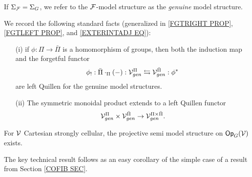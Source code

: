 \documentclass[a4paper,10pt]{article}%
\begin{document}
\begin{notation} 
  If $\Sigma_{\mathcal F} = \Sigma_G$, we refer to the $\mathcal F$-model structure as the \textit{genuine} model structure. 
\end{notation} 

\begin{remark}
        \label{GENUINE_FGTRIGHT_REMARK} 
  We record the following standard facts (generalized in \ref{FGTRIGHT PROP}, \ref{FGTLEFT PROP}, and \ref{EXTERINTADJ EQ}):
  \begin{itemize}
  \item [(i)] if $\phi: \Pi \to \bar \Pi$ is a homomorphism of groups, then both the induction map and the forgetful functor 
  \[ 
  \phi_!: \bar\Pi\cdot_\Pi(-): \mathcal V^\Pi_{gen} \leftrightarrows \mathcal V^{\bar \Pi}_{gen}: \phi^*
  \] 
  are left Quillen for the genuine model structures. 
  \item[(ii)] The symmetric monoidal product extends to a left Quillen functor
          \[
          \mathcal V^\Pi_{gen} \times \mathcal V^{\bar \Pi}_{gen} \to \mathcal V^{\Pi \times \bar\Pi}_{gen}.
          \]
  \end{itemize}
\end{remark} 

\begin{theorem}\label{OP_G_SEMI_MODEL_THM} 
  For $\mathcal V$ Cartesian strongly cellular, the projective semi model structure on $\mathsf{Op}_G(\mathcal V)$ exists.
\end{theorem} 

The key technical result follows as an easy corollary of the simple case of a result from Section \ref{COFIB SEC}.
\end{document}
